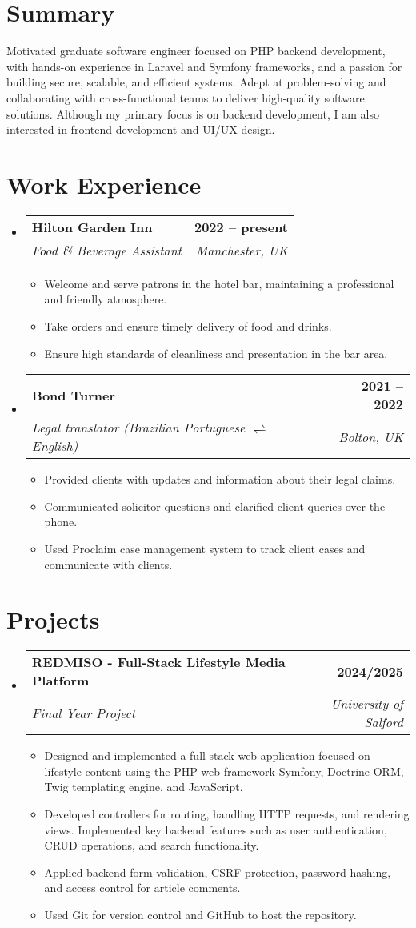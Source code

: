 \documentclass[a4paper,12pt]{article}
\makeatletter
\newcommand{\resumeSubHeadingListStart}{\begin{itemize}[leftmargin=0in, label={}]}
\newcommand{\resumeSubHeadingListEnd}{\end{itemize}}
\newcommand{\resumeSubheading}[4]{
  \item
    \begin{tabular*}{\textwidth}[t]{l@{\extracolsep{\fill}}r}
      \textbf{#1} & #2 \\
      \textit{#3} & \textit{#4} \\
    \end{tabular*}\vspace{-2pt}
}
\newcommand{\resumeItem}[1]{\item #1}
\newcommand{\resumeItemListStart}{\begin{itemize}[leftmargin=2em, label=\textbullet, itemsep=2pt]}
\newcommand{\resumeItemListEnd}{\end{itemize}}
\makeatother
\begin{document}
\section{Summary}
Motivated graduate software engineer focused on PHP backend development, with hands-on experience in Laravel and Symfony frameworks, and a passion for building secure, scalable, and efficient systems. Adept at problem-solving and collaborating with cross-functional teams to deliver high-quality software solutions. Although my primary focus is on backend development, I am also interested in frontend development and UI/UX design.

\section{Work Experience}
\resumeSubHeadingListStart

    \resumeSubheading
    {Hilton Garden Inn}{\bfseries{2022 -- present}}
    {Food \& Beverage Assistant}{Manchester, UK}
        \resumeItemListStart
            \resumeItem{Welcome and serve patrons in the hotel bar, maintaining a professional and friendly atmosphere.}
            \resumeItem{Take orders and ensure timely delivery of food and drinks.}
            \resumeItem{Ensure high standards of cleanliness and presentation in the bar area.}
        \resumeItemListEnd

\resumeSubHeadingListEnd

\resumeSubHeadingListStart
    \resumeSubheading
    {Bond Turner}{\bfseries{2021 -- 2022}}
    {Legal translator (Brazilian Portuguese \(\rightleftharpoons\) English)}{Bolton, UK}
        \resumeItemListStart
            \resumeItem{Provided clients with updates and information about their legal claims.}
            \resumeItem{Communicated solicitor questions and clarified client queries over the phone.}
            \resumeItem{Used Proclaim case management system to track client cases and communicate with clients.}
        \resumeItemListEnd

\resumeSubHeadingListEnd

\section{Projects}

\resumeSubHeadingListStart
    \resumeSubheading
    {REDMISO - Full-Stack Lifestyle Media Platform}{\bfseries{2024/2025}}
    {Final Year Project}{University of Salford}
        \resumeItemListStart
            \resumeItem{Designed and implemented a full-stack web application focused on lifestyle content using the PHP web framework Symfony, Doctrine ORM, Twig templating engine, and JavaScript.}
            \resumeItem{Developed controllers for routing, handling HTTP requests, and rendering views. Implemented key backend features such as user authentication, CRUD operations, and search functionality.}
            \resumeItem{Applied backend form validation, CSRF protection, password hashing, and access control for article comments.}
            \resumeItem{Used Git for version control and GitHub to host the repository.}
        \resumeItemListEnd
\resumeSubHeadingListEnd
\end{document}
